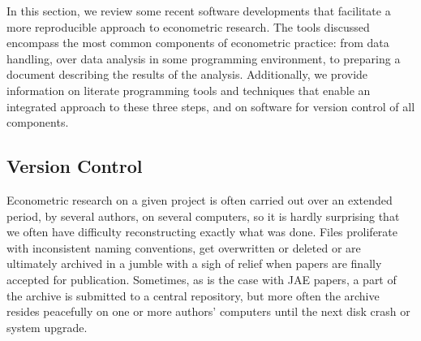 \documentclass[10pt,a4paper,twoside]{article}
\begin{document}
In this section, we review some recent software developments that facilitate a more 
reproducible approach to econometric research. The tools discussed encompass
the most common components of econometric practice: from data handling, over
data analysis in some programming environment, to preparing a document describing
the results of the analysis. Additionally, we provide information on literate
programming tools and techniques that enable an integrated approach to these
three steps, and on software for version control of all components.

\subsection{Version Control} \label{sec:version}

Econometric research on a given project is often carried out over an extended
period, by several authors, on several computers, so it is hardly surprising
that we often have difficulty reconstructing exactly what was done.  Files
proliferate with inconsistent naming conventions, get overwritten or deleted
or are ultimately archived in a jumble with a sigh of relief when papers are finally
accepted for publication.  Sometimes, as is the case with JAE papers, a part of the 
archive is submitted to a central repository, but more often the archive resides
peacefully on one or more authors' computers until the next disk crash or
system upgrade.
\end{document}
